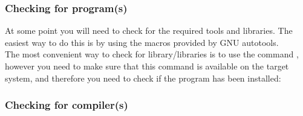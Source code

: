 \subsubsection{Checking for program(s)}
\label{cprog}

At some point you will need to check for the required tools and libraries. 
The easiest way to do this is by using the  macros provided by GNU autotools. \\[0.25cm]
The most convenient way to check for library/libraries is to use the command , however you need
to make sure that this command is available on the target system, and therefore you need to check if the program 
 has been installed: 
{\footnotesize{
\begin{script}
\end{script}
}}
\vspace{-1cm}
\subsubsection{Checking for compiler(s)}
\label{ccomp}


